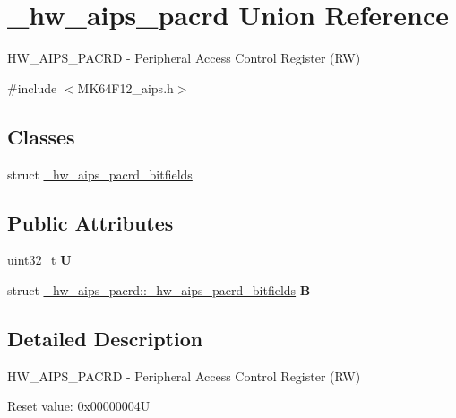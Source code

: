 \hypertarget{union__hw__aips__pacrd}{}\section{\+\_\+hw\+\_\+aips\+\_\+pacrd Union Reference}
\label{union__hw__aips__pacrd}


H\+W\+\_\+\+A\+I\+P\+S\+\_\+\+P\+A\+C\+RD -\/ Peripheral Access Control Register (RW)  




{\ttfamily \#include $<$M\+K64\+F12\+\_\+aips.\+h$>$}

\subsection*{Classes}
\begin{DoxyCompactItemize}
\item 
struct \hyperlink{struct__hw__aips__pacrd_1_1__hw__aips__pacrd__bitfields}{\+\_\+hw\+\_\+aips\+\_\+pacrd\+\_\+bitfields}
\end{DoxyCompactItemize}
\subsection*{Public Attributes}
\begin{DoxyCompactItemize}
\item 
uint32\+\_\+t {\bfseries U}\hypertarget{union__hw__aips__pacrd_a4985dbb657400860cb041ede81a2c1ed}{}\label{union__hw__aips__pacrd_a4985dbb657400860cb041ede81a2c1ed}

\item 
struct \hyperlink{struct__hw__aips__pacrd_1_1__hw__aips__pacrd__bitfields}{\+\_\+hw\+\_\+aips\+\_\+pacrd\+::\+\_\+hw\+\_\+aips\+\_\+pacrd\+\_\+bitfields} {\bfseries B}\hypertarget{union__hw__aips__pacrd_a5a6974ffb9b11a130e830052faaa3bdb}{}\label{union__hw__aips__pacrd_a5a6974ffb9b11a130e830052faaa3bdb}

\end{DoxyCompactItemize}


\subsection{Detailed Description}
H\+W\+\_\+\+A\+I\+P\+S\+\_\+\+P\+A\+C\+RD -\/ Peripheral Access Control Register (RW) 

Reset value\+: 0x00000004U


